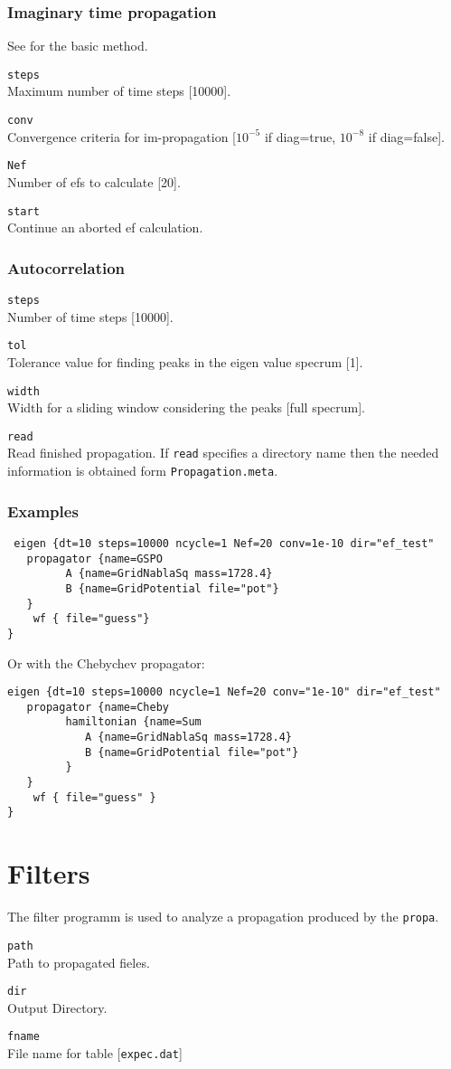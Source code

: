 \documentclass[a4paper,12pt]{scrbook}
\newcommand{\option}[2]{\item \texttt{#1}\\ #2}
\newcommand{\code}[1]{\texttt{#1}}
\begin{document}
\subsubsection*{Imaginary time propagation}
See \cite{Ezer86} for the basic method.
\begin{options}
\option{steps}{Maximum number of time steps [10000].}
\option{conv}{Convergence criteria for im-propagation [$10^{-5}$ if diag=true, $10^{-8}$ if diag=false].}
\option{Nef}{Number of efs to calculate [20].}
\option{start}{Continue an aborted ef calculation.}
\end{options}

\subsubsection*{Autocorrelation}
\begin{options}
\option{steps}{Number of time steps [10000].}
\option{tol}{Tolerance value for finding peaks in the eigen value specrum [1].}
\option{width}{Width for a sliding window considering the peaks [full specrum].}
\option{read}{Read finished propagation. If \code{read} specifies a directory name then the needed information is obtained form \code{Propagation.meta}.}
\end{options}


\subsubsection*{Examples}
\begin{verbatim}
 eigen {dt=10 steps=10000 ncycle=1 Nef=20 conv=1e-10 dir="ef_test"
   propagator {name=GSPO
         A {name=GridNablaSq mass=1728.4}
         B {name=GridPotential file="pot"}
   }
    wf { file="guess"}
}
\end{verbatim}
Or with the Chebychev propagator:
\begin{verbatim}
eigen {dt=10 steps=10000 ncycle=1 Nef=20 conv="1e-10" dir="ef_test"
   propagator {name=Cheby
         hamiltonian {name=Sum
            A {name=GridNablaSq mass=1728.4}
            B {name=GridPotential file="pot"}
         }
   }
    wf { file="guess" }
}
\end{verbatim}


\section{Filters}
The filter programm is used to analyze a propagation produced by the \verb|propa|.
\begin{options}
\option{path}{Path to propagated fieles.}
\option{dir}{Output Directory.}
\option{fname}{File name for table [\code{expec.dat}]}
\end{options}
\end{document}
